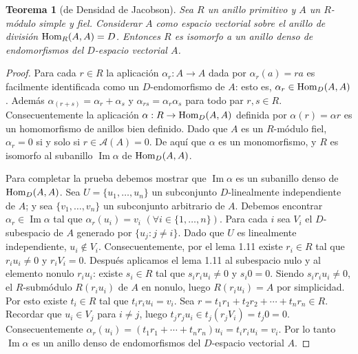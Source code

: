 \documentclass{report}
\newcommand{\Hom}{\textnormal{Hom}}
\DeclareMathOperator{\image}{\text{Im}}
\newtheorem{theorem}{Teorema}
\begin{document}
  \begin{theorem}[de Densidad de Jacobson]
    Sea \(R\) un anillo primitivo y \(A\) un \(R\)-módulo simple y fiel.
    Considerar \(A\) como espacio vectorial sobre el anillo de división \(\Hom_R(A, A) = D\).
    Entonces \(R\) es isomorfo a un anillo denso de endomorfismos del \(D\)-espacio vectorial \(A\).
  \end{theorem}
  \begin{proof}
    Para cada \(r \in R\) la aplicación \(\alpha_r : A \rightarrow A\) dada por \(\alpha_r(a) = r a\) es facilmente identificada como un \(D\)-endomorfismo de \(A\): esto es, \(\alpha_r \in \Hom_D(A, A)\).
    Además \(\alpha_{(r + s)} = \alpha_r + \alpha_s\) y \(\alpha_{r s} = \alpha_r \alpha_s\) para todo par \(r, s \in R\).
    Consecuentemente la aplicación \(\alpha : R \rightarrow \Hom_D(A, A)\) definida por \(\alpha(r) = \alpha r\) es un homomorfismo de anillos bien definido.
    Dado que \(A\) es un \(R\)-módulo fiel, \(\alpha_r = 0\) si y solo si \(r \in \mathcal{A}(A) = 0\).
    De aquí que \(\alpha\) es un monomorfismo, y \(R\) es isomorfo al subanillo \(\image \alpha\) de \(\Hom_D(A, A)\).

    Para completar la prueba debemos mostrar que \(\image \alpha\) es un subanillo denso de \(\Hom_D(A, A)\).
    Sea \(U = \{u_1, \dots, u_n\}\) un subconjunto \(D\)-linealmente independiente de \(A\); y sea \(\{v_1, \dots, v_n\}\) un subconjunto arbitrario de \(A\).
    Debemos encontrar \(\alpha_r \in \image \alpha\) tal que \(\alpha_r(u_i) = v_i\) \((\forall i \in \{1, \dots, n\})\).
    Para cada \(i\) sea \(V_i\) el \(D\)-subespacio de \(A\) generado por \(\{u_j : j \neq i\}\).
    Dado que \(U\) es linealmente independiente, \(u_i \notin V_i\).
    Consecuentemente, por el lema 1.11 existe \(r_i \in R\) tal que \(r_i u_i \neq 0\) y \(r_i V_i = 0\).
    Después aplicamos el lema 1.11 al subespacio nulo y al elemento nonulo \(r_i u_i\):
    existe \(s_i \in R\) tal que \(s_i r_i u_i \neq 0\) y \(s_i 0 = 0\).
    Siendo \(s_i r_i u_i \neq 0\), el \(R\)-submódulo \(R (r_i u_i)\) de \(A\) en nonulo, luego \(R (r_i u_i) = A\) por simplicidad.
    Por esto existe \(t_i \in R\) tal que \(t_i r_i u_i = v_i\).
    Sea \(r = t_1 r_1 + t_2 r_2 + \cdots + t_n r_n \in R\).
    Recordar que \(u_i \in V_j\) para \(i \neq j\), luego \(t_j r_j u_i \in t_j (r_j V_i) = t_j 0 = 0\).
    Consecuentemente \(\alpha_r(u_i) = (t_1 r_1 + \cdots + t_n r_n) u_i = t_i r_i u_i = v_i\).
    Por lo tanto \(\image \alpha\) es un anillo denso de endomorfismos del \(D\)-espacio vectorial \(A\).
  \end{proof}
\end{document}
